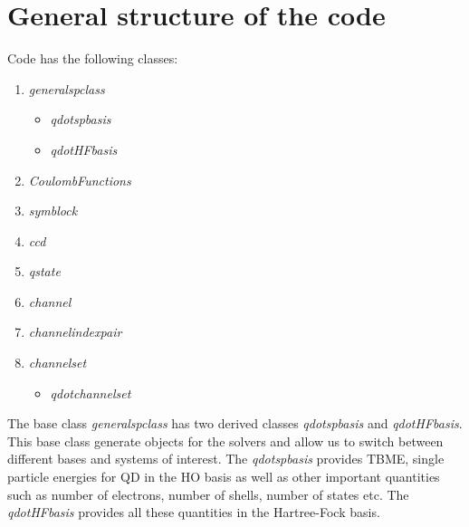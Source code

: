 \documentclass[twoside,english]{uiofysmaster}
\theoremstyle{definition}
\begin{document}
\section{General structure of the code}\label{sec:impl1}
Code has the following classes:
\begin{enumerate}
\item  \textit{generalspclass} 
	\begin{itemize}
	\item \textit{qdotspbasis}
	\item \textit{qdotHFbasis}
	\end{itemize}
\item \textit{CoulombFunctions}	
\item \textit{symblock}
\item \textit{ccd}
\item \textit{qstate}
\item \textit{channel}
\item \textit{channelindexpair}
\item \textit{channelset}
\begin{itemize}
	\item \textit{qdotchannelset}
\end{itemize}
\end{enumerate}
The base class \textit{generalspclass} has two derived classes \textit{qdotspbasis} and \textit{qdotHFbasis}. This base class generate objects for the solvers and allow us to switch between different bases and systems of interest. The \textit{qdotspbasis} provides TBME, single particle energies for QD in the HO basis as well as other important quantities such as number of electrons, number of shells, number of states etc. The \textit{qdotHFbasis} provides all these quantities in the Hartree-Fock basis. 
\end{document}
